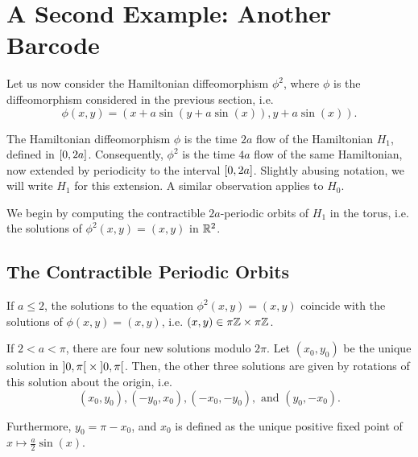 \section{A Second Example: Another Barcode}

Let us now consider the Hamiltonian diffeomorphism $\phi^2$, where $\phi$ is the diffeomorphism considered in the previous section, i.e.
\begin{equation}
\phi(x,y) = ( x + a \sin(y + a \sin(x)), y + a \sin(x)).
\end{equation}

The Hamiltonian diffeomorphism $\phi$ is the time $2a$ flow of the Hamiltonian $H_1$, defined in $\interval 0 {2a}$. Consequently, $\phi^2$ is the time $4a$ flow of the same Hamiltonian, now extended by periodicity to the interval $\interval 0 {2a}$. Slightly abusing notation, we will write $H_1$ for this extension. A similar observation applies to $H_0$.

We begin by computing the contractible $2a$-periodic orbits of $H_1$ in the torus, i.e. the solutions of $\phi^2(x,y) = (x,y)$ in $\mathbb{R}^2$.

\subsection{The Contractible Periodic Orbits}

\begin{prop}\label{prop:orbitsphi2}
If $a \leq 2$, the solutions to the equation $\phi^2(x,y) = (x,y)$ coincide with the solutions of $\phi(x,y) = (x,y)$, i.e. $(x,y) \in \pi \mathbb{Z} \times \pi \mathbb{Z}$.

If $2 < a < \pi$, there are four new solutions modulo $2\pi$. Let $(x_0, y_0)$ be the unique solution in $\ointerval 0 \pi \times \ointerval 0 \pi$. Then, the other three solutions are given by rotations of this solution about the origin, i.e.
\begin{equation}
(x_0, y_0), (-y_0, x_0), (-x_0, -y_0), \text{ and } (y_0, -x_0).
\end{equation}

Furthermore, $y_0 = \pi - x_0$, and $x_0$ is defined as the unique positive fixed point of $x \mapsto \frac a 2 \sin(x)$.
\end{prop}


